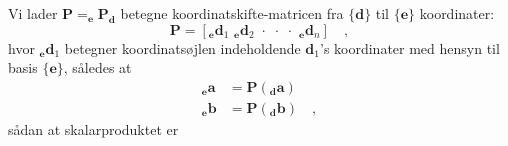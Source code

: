 Vi lader $\mathbf{P} = _{\mathbf{e}}\mathbf{P}_{\mathbf{d}}$ betegne koordinatskifte-matricen fra $\{\mathbf{d}\}$ til $\{ \mathbf{e} \}$ koordinater:
\begin{equation}
\mathbf{P} = \left[ _{\mathbf{e}}\mathbf{d}_{1}\,\, _{\mathbf{e}}\mathbf{d}_{2}\,\, \cdot \,\, \cdot \,\, \cdot \,\, _{\mathbf{e}}\mathbf{d}_{n} \right] \quad ,
\end{equation}
hvor $_{\mathbf{e}}\mathbf{d}_{1}$ betegner koordinatsøjlen indeholdende $\mathbf{d}_{1}$'s koordinater med hensyn til basis $\{ \mathbf{e} \}$,  således at
\begin{equation}
\begin{aligned}
_{\mathbf{e}}\mathbf{a} &= \mathbf{P} \left( _{\mathbf{d}}\mathbf{a}\right) \\
_{\mathbf{e}}\mathbf{b} &= \mathbf{P} \left(_{\mathbf{d}}\mathbf{b}\right) \quad ,
\end{aligned}
\end{equation}
sådan at skalarproduktet er
